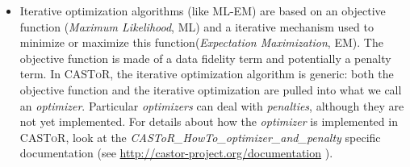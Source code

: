 \documentclass[a4paper, 11pt]{article}
\newcommand{\castor}{\textsc{CASToR}\xspace}
\begin{document}
\begin{itemize}

  \item Iterative optimization algorithms (like ML-EM) are based on an objective function (\textit{Maximum Likelihood}, ML) and a iterative mechanism
        used to minimize or maximize this function(\textit{Expectation Maximization}, EM).
        The objective function is made of a data fidelity term and potentially a penalty term. 
        In \castor, the iterative optimization algorithm is generic: both the objective function and the iterative optimization are pulled into
        what we call an \textit{optimizer}. 
        Particular \textit{optimizers} can deal with \textit{penalties}, although they are not yet implemented. 
        For details about how the \textit{optimizer} is implemented in \castor, look at the \textit{CASToR\_HowTo\_optimizer\_and\_penalty} specific
        documentation (see \url{http://castor-project.org/documentation} ).


\end{itemize}
\end{document}
